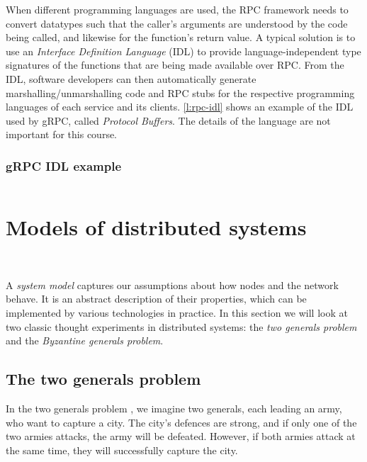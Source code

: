 When different programming languages are used, the RPC framework needs to convert datatypes such that the caller's arguments are understood by the code being called, and likewise for the function's return value.
A typical solution is to use an \emph{Interface Definition Language} (IDL) to provide language-independent type signatures of the functions that are being made available over RPC.
From the IDL, software developers can then automatically generate marshalling/unmarshalling code and RPC stubs for the respective programming languages of each service and its clients.
\autoref{l:rpc-idl} shows an example of the IDL used by gRPC, called \emph{Protocol Buffers}.
The details of the language are not important for this course.

\begin{frame}
    \label{s:rpc-idl}
    \frametitle{gRPC IDL example}
    \inputminted[fontsize=\scriptsize]{protobuf}{code/payment-rpc.proto}
\end{frame}
\label{l:rpc-idl}

\section{Models of distributed systems}\label{sec:system-models}

\begin{frame}
    \begin{center}
        {\Large{\color{darkblue}{Models of distributed systems}}} \\[2em]
        \mydetails
    \end{center}
\end{frame}

A \emph{system model} captures our assumptions about how nodes and the network behave.
It is an abstract description of their properties, which can be implemented by various technologies in practice.
In this section we will look at two classic thought experiments in distributed systems: the \emph{two generals problem} and the \emph{Byzantine generals problem}.

\subsection{The two generals problem}\label{sec:two-generals}

In the two generals problem \citep{Gray:1978}, we imagine two generals, each leading an army, who want to capture a city.
The city's defences are strong, and if only one of the two armies attacks, the army will be defeated.
However, if both armies attack at the same time, they will successfully capture the city.

